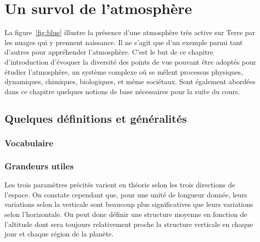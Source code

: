 \chapter{Un survol de l'atmosphère} \label{chap:int}


\bk
La figure~\ref{fig:blue} illustre la présence d'une atmosphère très active sur Terre par les nuages qui y prennent naissance. Il ne s'agit que d'un exemple parmi tant d'autres pour appréhender l'atmosphère. C'est le but de ce chapitre d'introduction d'évoquer la diversité des points de vue pouvant être adoptés pour étudier l'atmosphère, un système complexe où se mêlent processus physiques, dynamiques, chimiques, biologiques, et même sociétaux. Sont également abordées dans ce chapitre quelques notions de base nécessaires pour la suite du cours.


\mk
\section{Quelques définitions et généralités}

	\sk \subsection{Vocabulaire}
	


\sk
\subsection{Grandeurs utiles}

	

\sk
Les trois paramètres précités varient en théorie selon les trois directions de l'espace. On constate cependant que, pour une unité de longueur donnée, leurs variations selon la verticale sont beaucoup plus significatives que leurs variations selon l'horizontale. On peut donc définir une structure moyenne en fonction de l'altitude dont sera toujours relativement proche la structure verticale en chaque jour et chaque région de la planète. 

